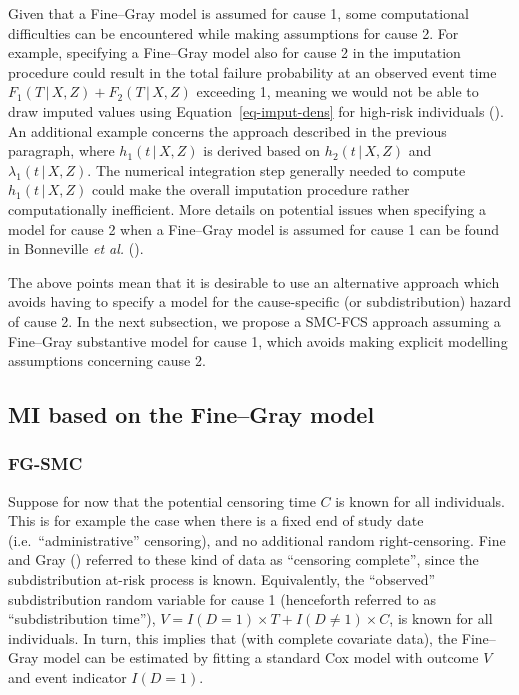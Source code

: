 \documentclass[
  letterpaper,
  DIV=11,
  numbers=noendperiod]{scrreprt}
\newcommand{\given}{\,|\,}
\begin{document}
Given that a Fine--Gray model is assumed for cause 1, some computational
difficulties can be encountered while making assumptions for cause 2.
For example, specifying a Fine--Gray model also for cause 2 in the
imputation procedure could result in the total failure probability at an
observed event time \(F_1(T \given X, Z) + F_2(T \given X, Z)\)
exceeding 1, meaning we would not be able to draw imputed values using
Equation~\ref{eq-imput-dens} for high-risk individuals
(). An additional example concerns the approach described in
the previous paragraph, where \(h_1(t \given X, Z)\) is derived based on
\(h_2(t \given X, Z)\) and \(\lambda_1(t \given X, Z)\). The numerical
integration step generally needed to compute \(h_1(t \given X, Z)\)
could make the overall imputation procedure rather computationally
inefficient. More details on potential issues when specifying a model
for cause 2 when a Fine--Gray model is assumed for cause 1 can be found
in Bonneville \emph{et al.}
().

The above points mean that it is desirable to use an alternative
approach which avoids having to specify a model for the cause-specific
(or subdistribution) hazard of cause 2. In the next subsection, we
propose a SMC-FCS approach assuming a Fine--Gray substantive model for
cause 1, which avoids making explicit modelling assumptions concerning
cause 2.

\subsection{MI based on the Fine--Gray model}\label{sec-subdist-time}

\subsubsection{FG-SMC}\label{sec-fg-smc}

Suppose for now that the potential censoring time \(C\) is known for all
individuals. This is for example the case when there is a fixed end of
study date (i.e.~``administrative'' censoring), and no additional random
right-censoring. Fine and Gray
() referred to
these kind of data as ``censoring complete'', since the subdistribution
at-risk process is known. Equivalently, the ``observed'' subdistribution
random variable for cause 1 (henceforth referred to as ``subdistribution
time''), \(V = I(D = 1) \times T + I(D \neq 1) \times C\), is known for
all individuals. In turn, this implies that (with complete covariate
data), the Fine--Gray model can be estimated by fitting a standard Cox
model with outcome \(V\) and event indicator \(I(D = 1)\).
\end{document}
